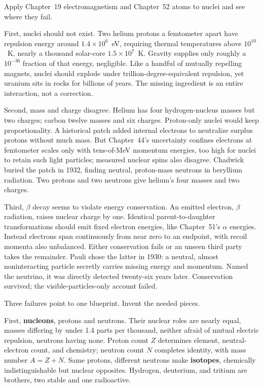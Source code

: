
Apply Chapter~19 electromagnetism and Chapter~52 atoms to nuclei and see where they fail.

First, nuclei should not exist. Two helium protons a femtometer apart have repulsion energy around \(1.4\times10^{6}\)~eV, requiring thermal temperatures above \(10^{10}\)~K, nearly a thousand solar-core \(1.5\times10^{7}\)~K. Gravity supplies only roughly a \(10^{-36}\) fraction of that energy, negligible. Like a handful of mutually repelling magnets, nuclei should explode under trillion-degree-equivalent repulsion, yet uranium sits in rocks for billions of years. The missing ingredient is an entire interaction, not a correction.

Second, mass and charge disagree. Helium has four hydrogen-nucleus masses but two charges; carbon twelve masses and six charges. Proton-only nuclei would keep proportionality. A historical patch added internal electrons to neutralize surplus protons without much mass. But Chapter~44's uncertainty confines electrons at femtometer scales only with tens-of-MeV momentum energies, too high for nuclei to retain such light particles; measured nuclear spins also disagree. Chadwick buried the patch in 1932, finding neutral, proton-mass neutrons in beryllium radiation. Two protons and two neutrons give helium's four masses and two charges.

Third, \(\beta\) decay seems to violate energy conservation. An emitted electron, \(\beta\) radiation, raises nuclear charge by one. Identical parent-to-daughter transformations should emit fixed electron energies, like Chapter~51's \(\alpha\) energies. Instead electrons span continuously from near zero to an endpoint, with recoil momenta also unbalanced. Either conservation fails or an unseen third party takes the remainder. Pauli chose the latter in 1930: a neutral, almost noninteracting particle secretly carries missing energy and momentum. Named the neutrino, it was directly detected twenty-six years later. Conservation survived; the visible-particles-only account failed.


Three failures point to one blueprint. Invent the needed pieces.

First, \textbf{nucleons}, protons and neutrons. Their nuclear roles are nearly equal, masses differing by under 1.4 parts per thousand, neither afraid of mutual electric repulsion, neutrons having none. Proton count \(Z\) determines element, neutral-electron count, and chemistry; neutron count \(N\) completes identity, with mass number \(A=Z+N\). Same protons, different neutrons make \textbf{isotopes}, chemically indistinguishable but nuclear opposites. Hydrogen, deuterium, and tritium are brothers, two stable and one radioactive.

